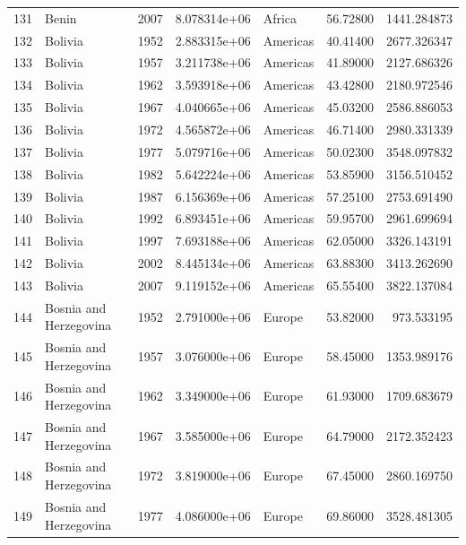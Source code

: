 \documentclass[
  letterpaper,
  DIV=11,
  numbers=noendperiod]{scrreprt}
\begin{document}
\begin{tabular}{llrrlrr}
131  &                     Benin &  2007 &  8.078314e+06 &    Africa &  56.72800 &    1441.284873 \\
132  &                   Bolivia &  1952 &  2.883315e+06 &  Americas &  40.41400 &    2677.326347 \\
133  &                   Bolivia &  1957 &  3.211738e+06 &  Americas &  41.89000 &    2127.686326 \\
134  &                   Bolivia &  1962 &  3.593918e+06 &  Americas &  43.42800 &    2180.972546 \\
135  &                   Bolivia &  1967 &  4.040665e+06 &  Americas &  45.03200 &    2586.886053 \\
136  &                   Bolivia &  1972 &  4.565872e+06 &  Americas &  46.71400 &    2980.331339 \\
137  &                   Bolivia &  1977 &  5.079716e+06 &  Americas &  50.02300 &    3548.097832 \\
138  &                   Bolivia &  1982 &  5.642224e+06 &  Americas &  53.85900 &    3156.510452 \\
139  &                   Bolivia &  1987 &  6.156369e+06 &  Americas &  57.25100 &    2753.691490 \\
140  &                   Bolivia &  1992 &  6.893451e+06 &  Americas &  59.95700 &    2961.699694 \\
141  &                   Bolivia &  1997 &  7.693188e+06 &  Americas &  62.05000 &    3326.143191 \\
142  &                   Bolivia &  2002 &  8.445134e+06 &  Americas &  63.88300 &    3413.262690 \\
143  &                   Bolivia &  2007 &  9.119152e+06 &  Americas &  65.55400 &    3822.137084 \\
144  &    Bosnia and Herzegovina &  1952 &  2.791000e+06 &    Europe &  53.82000 &     973.533195 \\
145  &    Bosnia and Herzegovina &  1957 &  3.076000e+06 &    Europe &  58.45000 &    1353.989176 \\
146  &    Bosnia and Herzegovina &  1962 &  3.349000e+06 &    Europe &  61.93000 &    1709.683679 \\
147  &    Bosnia and Herzegovina &  1967 &  3.585000e+06 &    Europe &  64.79000 &    2172.352423 \\
148  &    Bosnia and Herzegovina &  1972 &  3.819000e+06 &    Europe &  67.45000 &    2860.169750 \\
149  &    Bosnia and Herzegovina &  1977 &  4.086000e+06 &    Europe &  69.86000 &    3528.481305 \\

\end{tabular}
\end{document}
